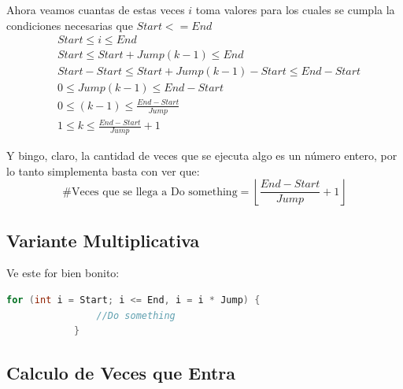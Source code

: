 \documentclass[12pt, fleqn]{article}                            %
\theoremstyle{break}                                            %
\newcommand{\Floor}[1]{\left \lfloor #1 \right \rfloor}         %
\begin{document}
        Ahora veamos cuantas de estas veces $i$ toma valores para los
        cuales se cumpla la condiciones necesarias que $Start <= End$
        \begin{align*}
            &Start \leq i \leq End                                                  \\
            &Start \leq Start + Jump(k - 1) \leq End                                \\
            &Start - Start \leq Start + Jump(k - 1) - Start \leq End - Start        \\
            &0 \leq Jump(k - 1) \leq End - Start                                    \\
            &0 \leq (k - 1) \leq \frac{End - Start}{Jump}                           \\
            &1 \leq k \leq \frac{End - Start}{Jump} + 1
        \end{align*}

        Y bingo, claro, la cantidad de veces que se ejecuta algo es un número
        entero, por lo tanto simplementa basta con ver que:
        \begin{equation*}
            \text{\# Veces que se llega a Do something} = \Floor{\frac{End - Start}{Jump} + 1}
        \end{equation*}



    \clearpage
    \subsection{Variante Multiplicativa}

        Ve este for bien bonito:
        \begin{lstlisting}[language=C, gobble=12, basicstyle={\small\color{white}}]
            for (int i = Start; i <= End, i = i * Jump) {
                //Do something
            }
        \end{lstlisting}

        \subsection{Calculo de Veces que Entra}
\end{document}
